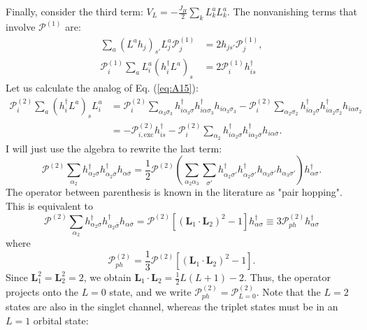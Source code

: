 \documentclass[11pt, a4paper]{article}
\begin{document}
Finally, consider the third term: $V_L = -\frac{J_H}{2} \sum_k L_k^a L_k^a$. The nonvanishing terms that involve $\mathcal{P}^{(1)}$ are:
\begin{align}
\sum_a (L^a h_j)_{s'} L_j^a \mathcal{P}_j^{(1)} &= 2h_{js'} \mathcal{P}_j^{(1)}, \label{eq:A37} \\
\mathcal{P}_i^{(1)} \sum_a L_i^a (h_i^{\dagger} L^a)_s &= 2\mathcal{P}_i^{(1)} h_{is}^{\dagger} \label{eq:A38}
\end{align}
Let us calculate the analog of Eq. (\ref{eq:A15}):
\begin{align}
\mathcal{P}_i^{(2)} \sum_a (h_i^{\dagger} L^a)_s L_i^a &= \mathcal{P}_i^{(2)} \sum_{\alpha_3 \sigma_3} h_{i\alpha_3 \sigma}^{\dagger} h_{i\alpha \sigma_3}^{\dagger} h_{i\alpha_3 \sigma_3} - \mathcal{P}_i^{(2)} \sum_{\alpha_2 \sigma_2} h_{i\alpha_2 \sigma}^{\dagger} h_{i\alpha_2 \sigma_2}^{\dagger} h_{i\alpha \sigma_2} \nonumber \\
&= -\mathcal{P}_{i, \text{exc}}^{(2)} h_{is}^{\dagger} - \mathcal{P}_i^{(2)} \sum_{\alpha_2} h_{i\alpha_2 \sigma}^{\dagger} h_{i\alpha_2 \overline{\sigma}}^{\dagger} h_{i\alpha \overline{\sigma}}. \label{eq:A40}
\end{align}
I will just use the algebra to rewrite the last term:
\begin{equation}
\mathcal{P}^{(2)} \sum_{\alpha_2} h_{\alpha_2 \sigma}^{\dagger} h_{\alpha_2 \overline{\sigma}}^{\dagger} h_{\alpha \overline{\sigma}} = \frac{1}{2} \mathcal{P}^{(2)} \left( \sum_{\alpha_2 \alpha_3} \sum_{\sigma'} h_{\alpha_2 \sigma'}^{\dagger} h_{\alpha_2 \overline{\sigma}'}^{\dagger} h_{\alpha_3 \overline{\sigma}'} h_{\alpha_3 \sigma'} \right) h_{\alpha \sigma}^{\dagger}. \label{eq:A41}
\end{equation}
The operator between parenthesis is known in the literature as "pair hopping". This is equivalent to
\begin{equation}
\mathcal{P}^{(2)} \sum_{\alpha_2} h_{\alpha_2 \sigma}^{\dagger} h_{\alpha_2 \overline{\sigma}}^{\dagger} h_{\alpha \overline{\sigma}} = \mathcal{P}^{(2)} [(\bm{L}_1 \cdot \bm{L}_2)^2 - 1] h_{\alpha \sigma}^{\dagger} \equiv 3\mathcal{P}_{ph}^{(2)} h_{\alpha \sigma}^{\dagger} \label{eq:A42}
\end{equation}
where
\begin{equation}
\mathcal{P}_{ph}^{(2)} = \frac{1}{3} \mathcal{P}^{(2)} [(\bm{L}_1 \cdot \bm{L}_2)^2 - 1]. \label{eq:A43}
\end{equation}
Since $\bm{L}_1^2 = \bm{L}_2^2 = 2$, we obtain $\bm{L}_1 \cdot \bm{L}_2 = \frac{1}{2}L(L+1) - 2$. Thus, the operator projects onto the $L=0$ state, and we write $\mathcal{P}_{ph}^{(2)} = \mathcal{P}_{L=0}^{(2)}$. Note that the $L=2$ states are also in the singlet channel, whereas the triplet states must be in an $L=1$ orbital state:
\end{document}

